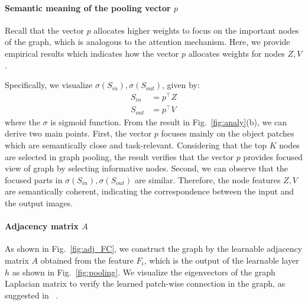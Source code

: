\documentclass[letterpaper]{article} %
\begin{document}
%


\paragraph{Semantic meaning of the pooling vector $p$ }
Recall that the vector $p$ allocates higher weights to focus on the important nodes of the graph, which is analogous to the attention mechanism.
Here, we provide empirical results which indicates how the vector $p$ allocates weights for nodes $Z, V$.


Specifically, we visualize $\sigma(S_{in}), \sigma(S_{out})$, given by:
\begin{align}
	S_{in} &= p^\top Z \\
	S_{out} &= p^\top V
\end{align}
where the $\sigma$ is sigmoid function.
From the result in Fig.~\ref{fig:analy}(b), we can derive two main points.
First, the vector $p$ focuses mainly on the object patches which are semantically close and task-relevant.
Considering that the top $K$ nodes are selected in graph pooling, the result verifies that the vector $p$ provides focused view of graph by selecting informative nodes.
Second, we can observe that the focused parts in $\sigma(S_{in}), \sigma(S_{out})$ are similar. Therefore, the node features $Z, V$ are semantically coherent, indicating the correspondence between the input and the output images.




\paragraph{Adjacency matrix $A$}
As shown in Fig.~\ref{fig:adj_FC},
we construct the graph by the learnable adjacency matrix $A$ obtained from the feature $F_i$, which is the output of the learnable layer $h$ as shown in Fig.~\ref{fig:pooling}. We visualize the eigenvectors of the graph Laplacian matrix to verify the learned patch-wise connection in the graph, as suggested in ~\cite{deepSpectral}.
\end{document}
